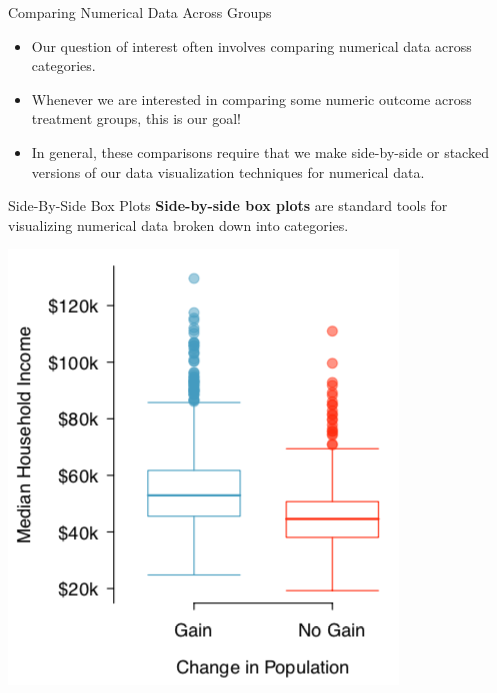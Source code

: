 \begin{frame}{Comparing Numerical Data Across Groups}
    \begin{itemize}
        \item Our question of interest often involves comparing numerical data across categories.
        \item Whenever we are interested in comparing some numeric outcome across treatment groups, this is our goal!
        \item In general, these comparisons require that we make side-by-side or stacked versions of our data visualization techniques for numerical data.
    \end{itemize}
\end{frame}

\begin{frame}{Side-By-Side Box Plots}
    \textbf{Side-by-side box plots} are standard tools for visualizing numerical data broken down into categories.
    
    \begin{center}
        \includegraphics[scale=0.35]{images/sidesidebox.png}
    \end{center}
\end{frame}

